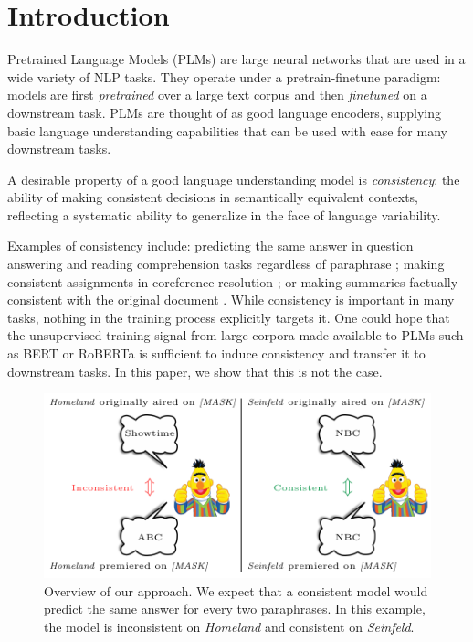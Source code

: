 \section{Introduction}
\label{sec:intro}

Pretrained Language Models (PLMs) are
large neural networks that are
used in a wide variety of NLP tasks. They operate under a
pretrain-finetune paradigm: models are first \emph{pretrained} over a large text corpus and then \emph{finetuned} on a downstream task. PLMs are thought of as good language encoders, supplying basic language understanding capabilities that can be used with ease for many downstream tasks.

A desirable property of a good language understanding model
is \emph{consistency}: the ability of  making consistent
decisions in semantically equivalent contexts, reflecting a
systematic ability to generalize in the face of language variability.


Examples of consistency include: predicting the same answer in question answering and reading comprehension tasks regardless of paraphrase \cite{consistent-qa}; making consistent assignments in coreference resolution \cite{denis2009global,chang2011inference}; or making summaries factually consistent with  the original document \cite{kryscinski2020evaluating}.
While consistency is important in many tasks, nothing in the
training process explicitly targets it. One could hope that
the unsupervised training signal from large corpora
made available to PLMs such as BERT or RoBERTa
\cite{bert,roberta} is sufficient to induce consistency and
transfer it to downstream tasks.
In this paper, we show that this is not the case.



\begin{figure}[t!]
\centering

\includegraphics[width=1.\columnwidth]{figures/overview2}

\caption{Overview of our approach. 
We expect that a consistent model would predict the same answer for every two paraphrases.
In this example, the model is inconsistent on \textit{Homeland} and consistent on \textit{Seinfeld}.}
\label{fig:overview}
\end{figure}


